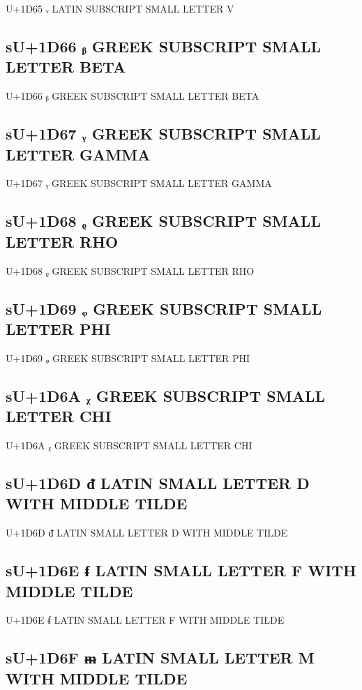 U+1D65 ᵥ LATIN SUBSCRIPT SMALL LETTER V

\iftestgreek

\subsection{sU+1D66 ᵦ GREEK SUBSCRIPT SMALL LETTER BETA}

U+1D66 ᵦ GREEK SUBSCRIPT SMALL LETTER BETA

\subsection{sU+1D67 ᵧ GREEK SUBSCRIPT SMALL LETTER GAMMA}

U+1D67 ᵧ GREEK SUBSCRIPT SMALL LETTER GAMMA

\subsection{sU+1D68 ᵨ GREEK SUBSCRIPT SMALL LETTER RHO}

U+1D68 ᵨ GREEK SUBSCRIPT SMALL LETTER RHO

\subsection{sU+1D69 ᵩ GREEK SUBSCRIPT SMALL LETTER PHI}

U+1D69 ᵩ GREEK SUBSCRIPT SMALL LETTER PHI

\subsection{sU+1D6A ᵪ GREEK SUBSCRIPT SMALL LETTER CHI}

U+1D6A ᵪ GREEK SUBSCRIPT SMALL LETTER CHI

\fi

\subsection{sU+1D6D ᵭ LATIN SMALL LETTER D WITH MIDDLE TILDE}

U+1D6D ᵭ LATIN SMALL LETTER D WITH MIDDLE TILDE

\subsection{sU+1D6E ᵮ LATIN SMALL LETTER F WITH MIDDLE TILDE}

U+1D6E ᵮ LATIN SMALL LETTER F WITH MIDDLE TILDE

\subsection{sU+1D6F ᵯ LATIN SMALL LETTER M WITH MIDDLE TILDE}

